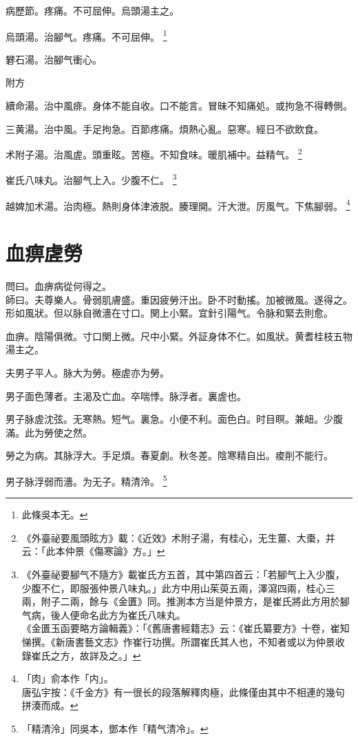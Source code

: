 病歷節。疼痛。不可屈伸。烏頭湯主之。

烏頭湯。治腳气。疼痛。不可屈伸。
	\footnote{此條吳本无。}

礬石湯。治腳气衝心。

附方

續命湯。治中風痱。身体不能自收。口不能言。冒昧不知痛処。或拘急不得轉側。

三黄湯。治中風。手足拘急。百節疼痛。煩熱心亂。惡寒。經日不欲飲食。

术附子湯。治風虗。頭重眩。苦極。不知食味。暖肌補中。益精气。
	\footnote{
		《外臺祕要風頭眩方》載：《近效》术附子湯，有桂心，无生薑、大棗，并云：「此本仲景《傷寒論》方。」
	}

崔氏八味丸。治腳气上入。少腹不仁。
	\footnote{
		《外臺祕要腳气不隨方》載崔氏方五首，其中第四首云：「若腳气上入少腹，少腹不仁，即服張仲景八味丸。」此方中用山茱萸五兩，澤瀉四兩，桂心三兩，附子二兩，餘与《金匱》同。推測本方当是仲景方，是崔氏將此方用於腳气病，後人便命名此方为崔氏八味丸。\\
		《金匱玉函要略方論輯義》：「《舊唐書經籍志》云：《崔氏纂要方》十卷，崔知悌撰。《新唐書藝文志》作崔行功撰。所謂崔氏其人也，不知者或以为仲景收錄崔氏之方，故詳及之。」
	}

越婢加术湯。治肉極。熱則身体津{\khaaitp 液}脱。腠理開。汗大泄。厉風气。下焦腳弱。
	\footnote{
		「肉」俞本作「内」。\\唐弘宇按：《千金方》有一很长的段落解釋肉極，此條僅由其中不相連的幾句拼湊而成。
	}

\chapter{血痹虗勞}

問曰。血痹病從何得之。\\
師曰。夫尊樂人。骨弱肌膚盛。重因疲勞汗出。卧不时動搖。加被微風。遂得之。{\khaaitp 形如風狀。}但以脉自微濇在寸口。関上小緊。宜針引陽气。令脉和緊去則愈。

血痹。陰陽俱微。寸口関上微。尺中小緊。外証身体不仁。如風狀。黄耆桂枝五物湯主之。

夫男子平人。脉大为勞。極虗亦为勞。

男子面色薄者。主渴及亡血。卒喘悸。脉浮者。裏虗也。

男子脉虗沈弦。无寒熱。短气。裏急。小便不利。面色白。时目瞑。兼衄。少腹滿。此为勞使之然。

勞之为病。其脉浮大。手足煩。春夏劇。秋冬差。陰寒精自出。痠削不能行。

男子脉浮弱而濇。为无子。精清泠。
	\footnote{
		「精清泠」同吳本，鄧本作「精气清冷」。
	}

